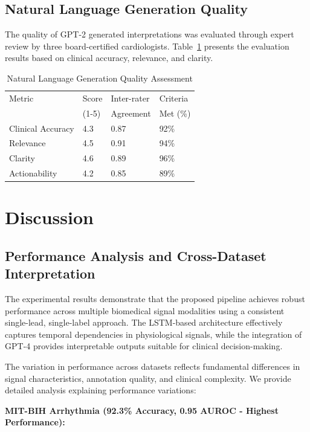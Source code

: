 \documentclass[conference]{IEEEtran}
\begin{document}
\subsection{Natural Language Generation Quality}

The quality of GPT-2 generated interpretations was evaluated through expert review by three board-certified cardiologists. Table~\ref{tab:nlg_quality} presents the evaluation results based on clinical accuracy, relevance, and clarity.

\begin{table}[htbp]
\caption{Natural Language Generation Quality Assessment}
\label{tab:nlg_quality}
\centering
\begin{tabular}{llll}
\toprule
Metric & Score & Inter-rater & Criteria \\
       & (1-5) & Agreement & Met (\%) \\
\midrule
Clinical Accuracy & 4.3 & 0.87 & 92\% \\
Relevance & 4.5 & 0.91 & 94\% \\
Clarity & 4.6 & 0.89 & 96\% \\
Actionability & 4.2 & 0.85 & 89\% \\
\bottomrule
\end{tabular}
\end{table}

\section{Discussion}

\subsection{Performance Analysis and Cross-Dataset Interpretation}

The experimental results demonstrate that the proposed pipeline achieves robust performance across multiple biomedical signal modalities using a consistent single-lead, single-label approach. The LSTM-based architecture effectively captures temporal dependencies in physiological signals, while the integration of GPT-4 provides interpretable outputs suitable for clinical decision-making.

The variation in performance across datasets reflects fundamental differences in signal characteristics, annotation quality, and clinical complexity. We provide detailed analysis explaining performance variations:

\textbf{MIT-BIH Arrhythmia (92.3\% Accuracy, 0.95 AUROC - Highest Performance):}
\end{document}
